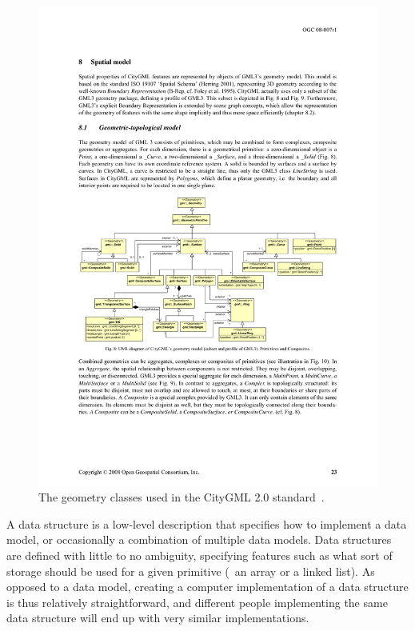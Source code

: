 \begin{figure}
\centering
\includegraphics[width=\linewidth]{figs/citygml.pdf}
\caption[The geometry classes used in the CityGML 2.0 standard]{The geometry classes used in the CityGML 2.0 standard~\citep{CityGML2.0}.}%
\label{fig:citygml}
\end{figure}

A data structure is a low-level description that specifies how to implement a data model, or occasionally a combination of multiple data models.
Data structures are defined with little to no ambiguity, specifying features such as what sort of storage should be used for a given primitive (\eg\ an array or a linked list). 
As opposed to a data model, creating a computer implementation of a data structure is thus relatively straightforward, and different people implementing the same data structure will end up with very similar implementations.


